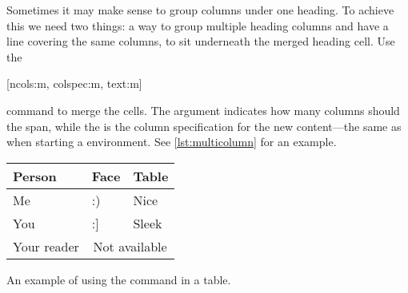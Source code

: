 Sometimes it may make sense to group columns under one heading. To achieve this
we need two things: a way to group multiple heading columns and have a line
covering the same columns, to sit underneath the merged heading cell. Use the
\begin{lscommand}
  [ncols:m, colspec:m, text:m]
\end{lscommand}
command to merge the cells. The  argument indicates how many
columns should the  span, while the  is the column
specification for the new content---the same as when starting a 
environment. See \autoref{lst:multicolumn} for an example.
\begin{listing}
  \begin{chktexignore}
  \begin{example}[examplewidth=0.8\linewidth, vertical_mode]
\begin{tabular}{@{}lll@{}}
  \toprule
  Person      & Face & Table                      \\
  \midrule
  Me          & :)   & Nice                       \\
  You         & :]   & Sleek                      \\
  Your reader & \multicolumn{2}{c}{Not available} \\
  \bottomrule
\end{tabular}
\end{example}
\end{chktexignore}
  \caption{An example of using the  command in a table.}\label{lst:multicolumn}
\end{listing}

